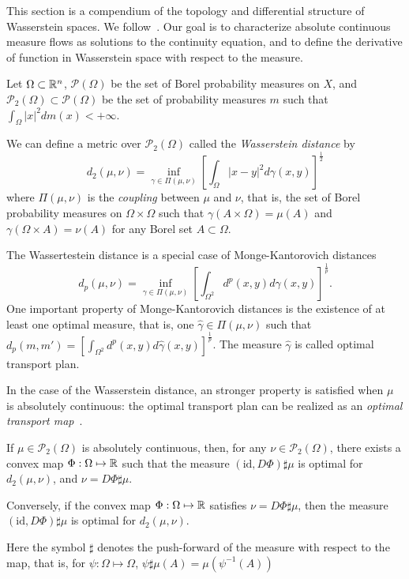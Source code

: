 This section is a compendium of the topology and differential structure of
Wasserstein spaces. We follow~\cite{cardaliaguet2010notes,ambrosio2005gradient,ambrosio2021lectures}.
Our goal is to characterize absolute continuous measure flows as solutions to the continuity equation,
and to define the derivative of function in Wasserstein space with respect to the measure.

Let $\Omega \subset \mathbb{R}^n$, $\mathcal{P}(\Omega)$ be the set of Borel
probability measures on $X$, and $\mathcal{P}_2(\Omega) \subset \mathcal{P}(\Omega)$
be the set of probability measures $m$ such that $\int_\Omega |x|^2 dm(x) < + \infty$.

We can define a metric over $\mathcal{P}_2(\Omega)$ called the 
\textit{Wasserstein distance} by
\begin{equation}\label{prob_measures:wasserstein_distance}
    d_2(\mu, \nu) = \inf_{\gamma \in \Pi(\mu,\nu)} {\left[ \int_\Omega |x - y|^2 d\gamma(x,y) \right]}^{\frac{1}{2}}
\end{equation}
where $\Pi(\mu,\nu)$ is the \textit{coupling} between $\mu$  and $\nu$,
that is, the set of Borel probability measures on $\Omega \times \Omega$
such that $\gamma(A \times \Omega) = \mu(A)$ and $\gamma(\Omega \times A) = \nu(A)$
for any Borel set $A \subset \Omega$.

The Wassertestein distance is a special case of Monge-Kantorovich distances
\begin{equation*}
    d_p(\mu, \nu) = \inf_{\gamma \in \Pi(\mu, \nu)} {\left[ \int_{\Omega^2} d^p(x,y) d\gamma(x,y)  \right]}^{\frac{1}{p}}.
\end{equation*}
One important property of Monge-Kantorovich distances is the existence of at least
one optimal measure, that is, one $\hat  \gamma \in \Pi(\mu,\nu)$ such that
$d_p(m,m') = {\left[ \int_{\Omega^2} d^p(x,y) d {\hat \gamma}(x,y) \right]}^{\frac{1}{p}}$.
The measure $\hat \gamma$ is called optimal transport plan.

In the case of the Wasserstein distance, an stronger property is satisfied when 
$\mu$ is absolutely continuous: the optimal transport plan can be realized as
an \textit{optimal transport map}~\cite{cardaliaguet2010notes}.
\begin{theorem}
    If $\mu \in \mathcal{P}_2(\Omega)$ is absolutely continuous, then,
    for any $\nu \in \mathcal{P}_2(\Omega)$, there exists a convex map 
    $\Phi: \Omega \mapsto \mathbb{R} $ such that the measure
    $ (\text{id}, D\Phi)\sharp \mu $ is optimal for $d_2(\mu, \nu)$, and $\nu = D \Phi \sharp \mu$.

    Conversely, if the convex map $\Phi : \Omega \mapsto \mathbb{R}$ satisfies $\nu = D \Phi \sharp \mu$,
    then the measure $(\text{id}, D\Phi)\sharp \mu$ is optimal for $d_ 2(\mu,\nu)$.
\end{theorem}
Here the symbol $\sharp$ denotes the push-forward of the measure with respect to the map,
that is, for $\psi : \Omega \mapsto \Omega$, $\psi \sharp \mu(A) = \mu(\psi^{-1}(A))$

